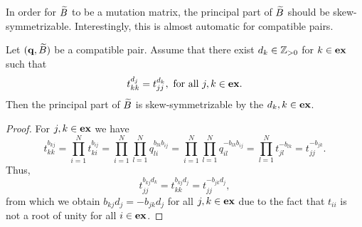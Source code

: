 In order for $\widetilde{B}$ to be a mutation matrix, the principal part of $\widetilde{B}$ should be
skew-symmetrizable. Interestingly, this is almost automatic for compatible pairs.
\begin{lemma}\label{lem:principal_part_skew_symmetrizable}
	Let $(\mathbf{q}, \widetilde{B})$ be a compatible pair. Assume that there exist $d_k \in \mathbb{Z}_{>0}$ for $k \in \mathbf{ex}$ such that
	\begin{equation*}
		t_{kk}^{d_j} = t_{jj}^{d_k}, \text{ for all } j,k \in \mathbf{ex}.
	\end{equation*}
	Then the principal part of $\widetilde{B}$ is skew-symmetrizable by the $d_k, k\in \mathbf{ex}$.
\end{lemma}
\begin{proof}

	For $j,k \in \mathbf{ex}$ we have
	\begin{equation*}
		t_{kk}^{b_{kj}} = \prod_{i=1}^N t_{ki}^{b_{ij}} = \prod_{i=1}^N\prod_{l=1}^N q_{li}^{b_{lk}b_{ij}} =
		\prod_{i=1}^N\prod_{l=1}^N q_{il}^{-b_{lk}b_{ij}} = \prod_{l=1}^N t_{jl}^{-b_{lk}} = t_{jj}^{-b_{jk}}.
	\end{equation*}
	Thus,
	\begin{equation*}
		t_{jj}^{b_{kj} d_k} = t_{kk}^{ b_{kj}d_j} = t_{jj}^{- b_{jk} d_j},
	\end{equation*}
	from which we obtain $b_{kj} d_j = -b_{jk} d_j$ for all $j, k \in \mathbf{ex}$ due to the fact that $t_{ii}$ is not a root of unity for all $i \in \mathbf{ex}$.
\end{proof}

